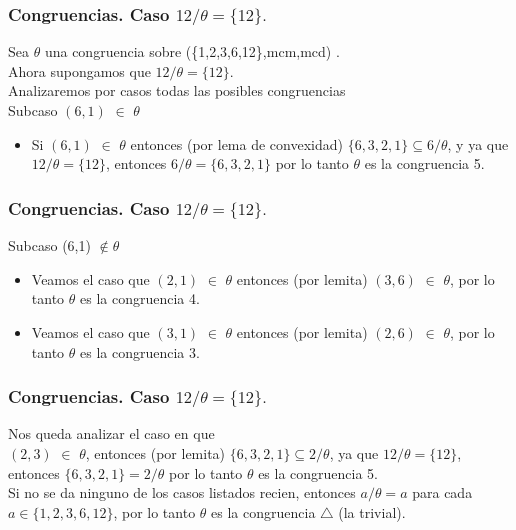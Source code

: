 \documentclass{beamer}
\begin{document}
\begin{frame}
\frametitle{Congruencias. Caso $12/\theta=\{12\}.$}
Sea $\theta$ una congruencia sobre (\{1,2,3,6,12\},mcm,mcd) .\\

\noindent Ahora supongamos que $12/\theta=\{12\}.$\\
Analizaremos por casos todas las posibles congruencias\\
Subcaso $(6,1)$ $\in$ $\theta$ \\
\begin{itemize}
	\item     Si $(6,1)$ $\in$ $\theta$ entonces (por lema de convexidad)
    $\{6,3,2,1\} \subseteq 6/\theta$, y ya que $12/\theta=\{12\}$, entonces $6/\theta = \{6,3,2,1\}$ por lo tanto $\theta$ es la congruencia 5.\\
\end{itemize}
\end{frame}

\begin{frame}
\frametitle{Congruencias. Caso $12/\theta=\{12\}.$}
Subcaso (6,1) $\not \in \theta$
\begin{itemize}
\item Veamos el caso que $(2,1)$ $\in$ $\theta$ entonces (por lemita) $(3,6)$ $\in$
    $\theta$, por lo tanto $\theta$ es la congruencia 4.\\

\item Veamos el caso que $(3,1)$ $\in$ $\theta$ entonces (por lemita) $(2,6)$ $\in$
    $\theta$, por lo tanto $\theta$ es la congruencia 3.\\  

\end{itemize}
    
\end{frame}

\begin{frame}
\frametitle{Congruencias. Caso $12/\theta=\{12\}.$}
Nos queda analizar el caso en que\\
    $(2,3)$ $\in$ $\theta$, entonces (por lemita) $\{6,3,2,1\} \subseteq 2/\theta$, ya que $12/\theta=\{12\}$, entonces $\{6,3,2,1\} = 2/\theta$ por lo tanto $\theta$ es la congruencia 5.\\
    Si no se da ninguno de los casos listados recien, entonces $a/\theta={a}$ para cada $a \in
    \{1,2,3,6,12\}$, por lo tanto $\theta$ es la congruencia $\bigtriangleup$ (la trivial).\\


\end{frame}
\end{document}
